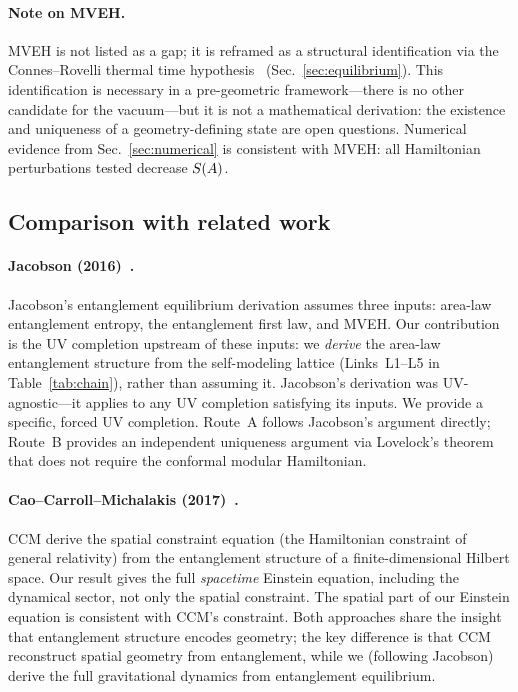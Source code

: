\paragraph{Note on MVEH.}
MVEH is not listed as a gap; it is reframed as a structural
identification via the Connes--Rovelli thermal time
hypothesis~\cite{ConnesRovelli1994}
(Sec.~\ref{sec:equilibrium}).  This identification is necessary
in a pre-geometric framework---there is no other candidate for
the vacuum---but it is not a mathematical derivation: the existence
and uniqueness of a geometry-defining state are open questions.
Numerical evidence from Sec.~\ref{sec:numerical} is consistent
with MVEH: all Hamiltonian perturbations tested decrease $S(A)$.

\subsection{Comparison with related work}
\label{sec:comparison}

\paragraph{Jacobson (2016)~\cite{Jacobson2016}.}
Jacobson's entanglement equilibrium derivation assumes three inputs:
area-law entanglement entropy, the entanglement first law, and MVEH.
Our contribution is the UV completion upstream of these inputs: we
\emph{derive} the area-law entanglement structure from the self-modeling
lattice (Links~L1--L5 in Table~\ref{tab:chain}), rather than assuming it.
Jacobson's derivation was UV-agnostic---it applies to any UV completion
satisfying its inputs.  We provide a specific, forced UV completion.
Route~A follows Jacobson's argument directly; Route~B provides an
independent uniqueness argument via Lovelock's theorem that does not
require the conformal modular Hamiltonian.

\paragraph{Cao--Carroll--Michalakis (2017)~\cite{CCM2017}.}
CCM derive the spatial constraint equation (the Hamiltonian constraint of
general relativity) from the entanglement structure of a
finite-dimensional Hilbert space.  Our result gives the full
\emph{spacetime} Einstein equation, including the dynamical sector, not
only the spatial constraint.  The spatial part of our Einstein equation is
consistent with CCM's constraint.  Both approaches share the insight that
entanglement structure encodes geometry; the key difference is that CCM
reconstruct spatial geometry from entanglement, while we (following
Jacobson) derive the full gravitational dynamics from entanglement
equilibrium.

